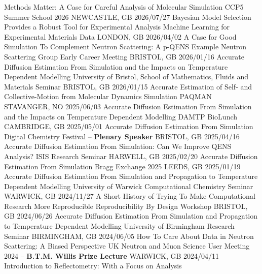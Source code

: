 \vspace{-0.4cm}
\begin{dayenumerate}
  \cvpresentation
    {Methods Matter: A Case for Careful Analysis of Molecular Simulation}
    {CCP5 Summer School 2026}
    {NEWCASTLE, GB}
    {2026/07/27}
  \cvpresentation
    {Bayesian Model Selection Provides a Robust Tool for Experimental Analysis}
	  {Machine Learning for Experimental Materials Data}
	  {LONDON, GB}
	  {2026/04/02}
  \cvpresentation
    {A Case for Good Simulation To Complement Neutron Scattering: A p-QENS Example}
    {Neutron Scattering Group Early Career Meeting}
    {BRISTOL, GB}
    {2026/01/16} 
  \cvpresentation
    {Accurate Diffusion Estimation From Simulation and the Impacts on Temperature Dependent Modelling}
    {University of Bristol, School of Mathematics, Fluids and Materials Seminar}
    {BRISTOL, GB}
    {2026/01/15}
  \cvpresentation
    {Accurate Estimation of Self- and Collective-Motion from Molecular Dynamics Simulation}
    {PAQMAN}
    {STAVANGER, NO}
    {2025/06/03} 
  \cvpresentation
    {Accurate Diffusion Estimation From Simulation and the Impacts on Temperature Dependent Modelling}
    {DAMTP BioLunch}
    {CAMBRIDGE, GB}
    {2025/05/01}
  \cvpresentation
    {Accurate Diffusion Estimation From Simulation}
    {Digital Chemistry Festival -- \textbf{Plenary Speaker}} 
    {BRISTOL, GB}
    {2025/04/16}  
  \cvpresentation
    {Accurate Diffusion Estimation From Simulation: Can We Improve QENS Analysis?}
    {ISIS Research Seminar}
    {HARWELL, GB}
    {2025/02/20}
  \cvpresentation
    {Accurate Diffusion Estimation From Simulation}
    {Bragg Exchange 2025}
    {LEEDS, GB}
    {2025/01/19} 
  \cvpresentation
    {Accurate Diffusion Estimation From Simulation and Propagation to Temperature Dependent Modelling}
    {University of Warwick Computational Chemistry Seminar}
    {WARWICK, GB}
    {2024/11/27}
  \cvpresentation
    {A Short History of Trying To Make Computational Research More Reproducible}
    {Reproducibility By Design Workshop}
    {BRISTOL, GB}
    {2024/06/26}
  \cvpresentation
    {Accurate Diffusion Estimation From Simulation and Propagation to Temperature Dependent Modelling}
    {University of Birmingham Research Seminar}
    {BIRMINGHAM, GB}
    {2024/06/05}
  \cvpresentation
    {How To Care About Data in Neutron Scattering: A Biased Perspective}
    {UK Neutron and Muon Science User Meeting 2024 -- \textbf{B.T.M. Willis Prize Lecture}}
    {WARWICK, GB}
    {2024/04/11}
  \cvpresentation
    {Introduction to Reflectometry: With a Focus on Analysis}

\end{dayenumerate}
